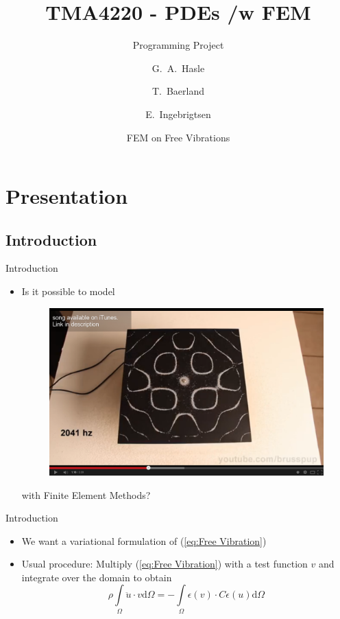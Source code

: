 \documentclass{beamer}[10pt]
\title{TMA4220 - PDEs /w FEM}
\subtitle{Programming Project}
\author{G.~A.~Hasle \and T.~Baerland \and E.~Ingebrigtsen}
\date{FEM on Free Vibrations}
\begin{document}
\begin{frame}
  \titlepage
\end{frame}

\section{Presentation}

\subsection{Introduction}
\begin{frame}{Introduction}
  \begin{itemize}
  \begin{block}{The Free Vibration Equation}
\begin{equation}
\rho\frac{\partial^2u}{\partial t^2} = \nabla\sigma(u)
\label{eq:Free Vibration}
\end{equation}
\end{block}
  \item {   
    Is it possible to model 
    \begin{figure}
    \centering
    \includegraphics[scale=0.1]{yosnap.png}
    \end{figure}
	with Finite Element Methods?  
  }
  \end{itemize}
\end{frame}

\begin{frame}{Introduction}	
\begin{itemize}
\item {
We want a variational formulation of (\ref{eq:Free Vibration})

}
\item {
Usual procedure: Multiply (\ref{eq:Free Vibration}) with a test function $v$ and integrate over the domain to obtain 
\begin{equation}
\rho \int\limits_{\Omega} \ddot{u}\cdot v\mathrm{d}\Omega = - \int\limits_{\Omega}\epsilon\left(v\right)\cdot C \epsilon\left(u\right)\mathrm{d}\Omega
\label{eq:Variational Form}
\end{equation}
}
\end{itemize}
\end{frame}
\end{document}
